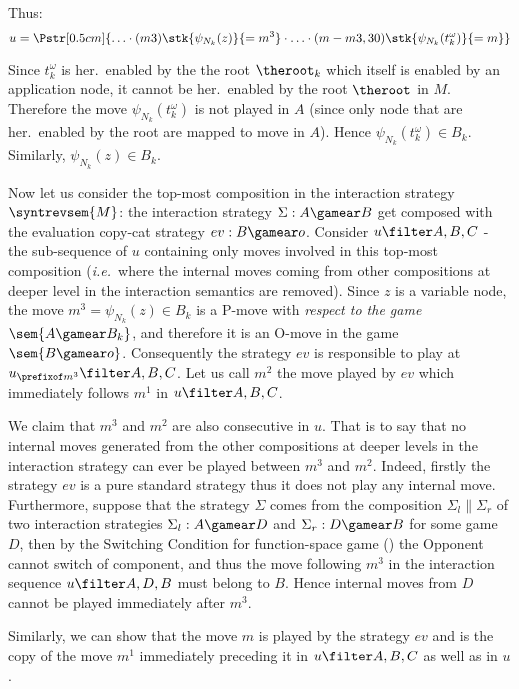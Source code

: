 \begin{itemize}[$\bullet$]
{\begin{enumerate}
\begin{itemize}
\begin{enumerate}[(a)]
        Thus:
        $$u = \Pstr[0.5cm]{ \ldots \cdot (m3){\stk{\psi_{N_k}(z)}{=m^3}} \cdot
                    \ldots \cdot (m-m3,30){\stk{\psi_{N_k}(t_k^\omega)}{=m}} } $$

        Since $t_k^\omega$ is her.\ enabled by the the root $\theroot_k$ which itself is enabled by an application node, it cannot be her.\ enabled by the root $\theroot$ in $M$. Therefore the move $\psi_{N_k}(t_k^\omega)$ is not played in $A$ (since only node that are her.\ enabled by the root are mapped to move in $A$). Hence $\psi_{N_k}(t_k^\omega) \in B_k$. Similarly, $\psi_{N_k}(z) \in B_k$.

        Now let us consider the top-most composition in the interaction strategy $\syntrevsem{M}$: the interaction strategy $\Sigma: A \gamear B$ get composed with the evaluation copy-cat strategy $ev:B \gamear o$. Consider $ u \filter A,B,C$ - the sub-sequence of $u$ containing only moves involved in this top-most composition ({\it i.e.}\ where the internal moves coming from other compositions at deeper level in the interaction semantics are removed). Since $z$ is a variable node, the move $m^3 = \psi_{N_k}(z) \in B_k$ is a P-move with \emph{respect to the game} $\sem{A \gamear B_k}$, and therefore it is an O-move in the game $\sem{B \gamear o}$. Consequently the strategy $ev$ is responsible to play at $u_{\prefixof m^3} \filter A, B, C$. Let us call $m^2$ the move played by $ev$ which immediately follows $m^1$ in $u\filter A,B,C$.

        We claim that $m^3$ and $m^2$ are also consecutive in $u$. That is to say that no internal moves generated from the        other compositions at deeper levels in the interaction strategy can ever be played between $m^3$ and $m^2$. Indeed, firstly the strategy $ev$ is a pure standard strategy thus it does not play any internal move. Furthermore, suppose that the strategy $\Sigma$ comes from the composition $\Sigma_l \| \Sigma_r$ of two interaction strategies $\Sigma_l: A \gamear D$ and $\Sigma_r: D\gamear B$ for some game $D$, then by the Switching Condition for function-space game (\cite{hylandong_pcf}) the Opponent cannot switch of component, and thus the move following $m^3$ in the interaction sequence $u \filter A,D,B$ must belong to $B$. Hence internal moves from $D$ cannot be played immediately after $m^3$.

        Similarly, we can show that the move $m$ is played by the strategy $ev$ and is the copy of the move $m^1$ immediately preceding it in $u\filter A,B,C$ as well as in $u$.


\end{enumerate}
\end{itemize}
\end{enumerate}}
\end{itemize}
